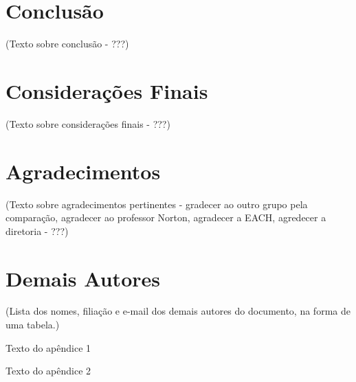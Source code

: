 \documentclass[12pt,a4paper,brazilian,utf8]{ppgsi}
\begin{document}
\section{Conclusão}
    (Texto sobre conclusão - ???)

\section{Considerações Finais}
    (Texto sobre considerações finais - ???)

\section*{Agradecimentos}
    (Texto sobre agradecimentos pertinentes - gradecer ao outro grupo pela comparação, agradecer ao professor Norton, agradecer a EACH, agredecer a diretoria - ???)

\section*{Demais Autores}
    (Lista dos nomes, filiação e e-mail dos demais autores do documento, na forma de uma tabela.)
    



\appendix

    Texto do apêndice 1

    Texto do apêndice 2
\end{document}
